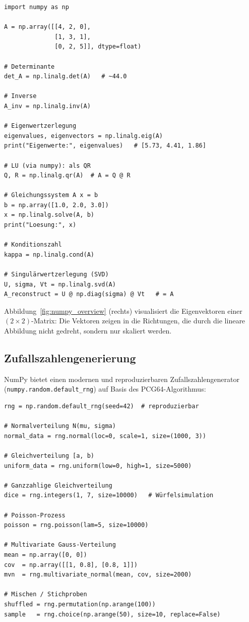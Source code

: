 \documentclass[12pt, a4paper]{article}
\begin{document}
\begin{lstlisting}[caption={Lineare Algebra: Eigenwerte, Matrixoperationen}]
import numpy as np

A = np.array([[4, 2, 0],
              [1, 3, 1],
              [0, 2, 5]], dtype=float)

# Determinante
det_A = np.linalg.det(A)   # ~44.0

# Inverse
A_inv = np.linalg.inv(A)

# Eigenwertzerlegung
eigenvalues, eigenvectors = np.linalg.eig(A)
print("Eigenwerte:", eigenvalues)   # [5.73, 4.41, 1.86]

# LU (via numpy): als QR
Q, R = np.linalg.qr(A)  # A = Q @ R

# Gleichungssystem A x = b
b = np.array([1.0, 2.0, 3.0])
x = np.linalg.solve(A, b)
print("Loesung:", x)

# Konditionszahl
kappa = np.linalg.cond(A)

# Singulärwertzerlegung (SVD)
U, sigma, Vt = np.linalg.svd(A)
A_reconstruct = U @ np.diag(sigma) @ Vt   # = A
\end{lstlisting}

Abbildung~\ref{fig:numpy_overview} (rechts) visualisiert die Eigenvektoren
einer $(2\times2)$-Matrix: Die Vektoren zeigen in die Richtungen, die durch
die lineare Abbildung nicht gedreht, sondern nur skaliert werden.

\subsection{Zufallszahlengenerierung}
\label{subsec:numpy-random}

NumPy bietet einen modernen und reproduzierbaren Zufallszahlengenerator
(\texttt{numpy.random.\allowbreak{}default\_rng}) auf Basis des PCG64-Algorithmus:

\begin{lstlisting}[caption={Zufallsverteilungen mit NumPy}]
rng = np.random.default_rng(seed=42)  # reproduzierbar

# Normalverteilung N(mu, sigma)
normal_data = rng.normal(loc=0, scale=1, size=(1000, 3))

# Gleichverteilung [a, b)
uniform_data = rng.uniform(low=0, high=1, size=5000)

# Ganzzahlige Gleichverteilung
dice = rng.integers(1, 7, size=10000)   # Würfelsimulation

# Poisson-Prozess
poisson = rng.poisson(lam=5, size=10000)

# Multivariate Gauss-Verteilung
mean = np.array([0, 0])
cov  = np.array([[1, 0.8], [0.8, 1]])
mvn  = rng.multivariate_normal(mean, cov, size=2000)

# Mischen / Stichproben
shuffled = rng.permutation(np.arange(100))
sample   = rng.choice(np.arange(50), size=10, replace=False)
\end{lstlisting}
\end{document}
